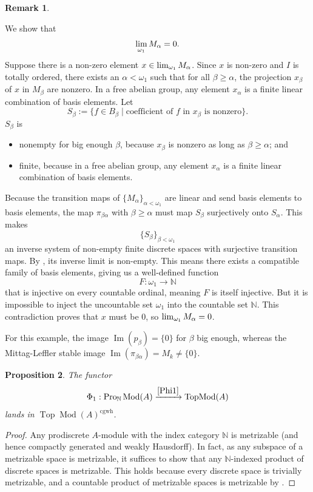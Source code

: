 \documentclass[11pt]{amsart}
\newcommand{\xra}{\xrightarrow}
\newcommand{\N}{\mathbb{N}}
\renewcommand{\Im}{\operatorname{Im}}
\newcommand{\Mod}{\operatorname{Mod}}
\newcommand{\Top}{\operatorname{Top}}
\newcommand{\cgwh}{\operatorname{cgwh}}
\newcommand{\TopMod}{\operatorname{TopMod}}
\renewcommand{\lim}{\operatornamewithlimits{\rm{lim}}}
\newcommand{\Pro}{\operatorname{Pro}}
\theoremstyle{plain}
\newtheorem{prop}{Proposition}[section]
\theoremstyle{definition}
\newtheorem{rmk}[prop]{Remark}
\numberwithin{equation}{prop}
\begin{document}
\begin{rmk}
\begin{enumerate}
We show that 
$$\lim_{\omega_1} M_\alpha = 0.$$
Suppose there is a non-zero element $x \in \lim_{\omega_1} M_\alpha$. 
Since $x$ is non-zero and $I$ is totally ordered, there exists an $\alpha<\omega_1$ such that for all $\beta\ge \alpha$, the projection $x_\beta$ of $x$ in $M_\beta$  are nonzero. 
In a free abelian group, any element $x_\alpha$ is a finite linear combination of basis elements. Let 
$$S_\beta:=\{ f\in B_\beta\mid 
\text{coefficient of $f$ in $x_\beta$ is nonzero}
\}.$$
$S_\beta$ is 
\begin{itemize} 
\item 
nonempty for big enough $\beta$, because $x_\beta$ is nonzero as long as $\beta\ge \alpha$; and 
\item 
finite, because in a free abelian group, any element $x_\alpha$ is a finite linear combination of basis elements. 
\end{itemize}
Because the transition maps of 
$\{M_\alpha\}_{\alpha<\omega_1}$
are linear and send basis elements to basis elements, 
the map $\pi_{\beta\alpha}$ with $\beta\ge \alpha$ must map $S_\beta$ surjectively onto $S_\alpha$. 
This makes
$$\{S_\beta\}_{\beta<\omega_1}$$ 
an inverse system of non-empty finite discrete spaces with surjective transition maps. 
By \cite[Proposition 1.1.4]{RZ2010}, its inverse limit is non-empty. 
This means there exists a compatible family of basis elements, giving us a well-defined function $$F: \omega_1 \to \mathbb{N}$$
that is injective on every countable ordinal, meaning $F$ is itself injective. 
But it is impossible to inject the uncountable set $\omega_1$ into the countable set $\mathbb{N}$. 
This contradiction proves that $x$ must be $0$, so $\lim_{\omega_1} M_\alpha = 0$.

For this example, the image  $\Im(p_\beta) = \{0\}$ for $\beta$ big enough, whereas the Mittag-Leffler stable image $\Im(\pi_{\beta\alpha}) = M_k \neq \{0\}$. 

\end{enumerate}
\end{rmk}



\begin{prop}\label{Phi1landsincgwh}
The functor $$\Phi_1:\Pro_{\N}\Mod(A)\xra{\eqref{Phi1}} \TopMod(A)$$ lands in  $\Top\Mod(A)^{\cgwh}$.
\end{prop}


\begin{proof}
Any prodiscrete $A$-module with the index category $\N$ is metrizable (and hence compactly generated and weakly Hausdorff).
In fact, as any subspace of a metrizable space is metrizable, it suffices to show that any $\N$-indexed product of discrete spaces is metrizable.
This holds because every discrete space is trivially metrizable, and a countable product of metrizable spaces is metrizable by \cite[IX. Corollary 7.3]{Dugundji66}.
\end{proof}
\end{document}
